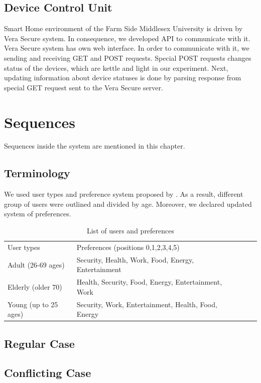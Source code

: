 \documentclass{llncs}
\begin{document}
    \subsection{Device Control Unit}
    Smart Home environment of the Farm Side Middlesex University is driven by Vera Secure system.
    In consequence, we developed API to communicate with it.
    Vera Secure system has own web interface.
    In order to communicate with it, we sending and receiving GET and POST requests.
    Special POST requests changes status of the devices, which are kettle and light in our experiment.
    Next, updating information about device statuses is done by parsing response from special GET request sent to the Vera Secure server.
    \section{Sequences}
    Sequences inside the system are mentioned in this chapter.
    \subsection{Terminology}
    We used user types and preference system proposed by \cite{9} .
    As a result, different group of users were outlined and divided by age.
    Moreover, we declared updated system of preferences.
    \begin{table}
        \caption{List of users and preferences}
        \begin{tabular}{llllll}
            \hline\noalign{\smallskip}
            User types & Preferences (positions 0,1,2,3,4,5)\\
            \noalign{\smallskip}
            \hline
            \noalign{\smallskip}
            Adult (26-69 ages) & Security, Health, Work, Food, Energy, Entertainment\\
            Elderly (older 70) & Health, Security, Food, Energy, Entertainment, Work\\
            Young (up to 25 ages) & Security, Work, Entertainment, Health, Food, Energy\\
            \hline
        \end{tabular}
    \end{table}

    \subsection{Regular Case}
    \subsection{Conflicting Case}
\end{document}
